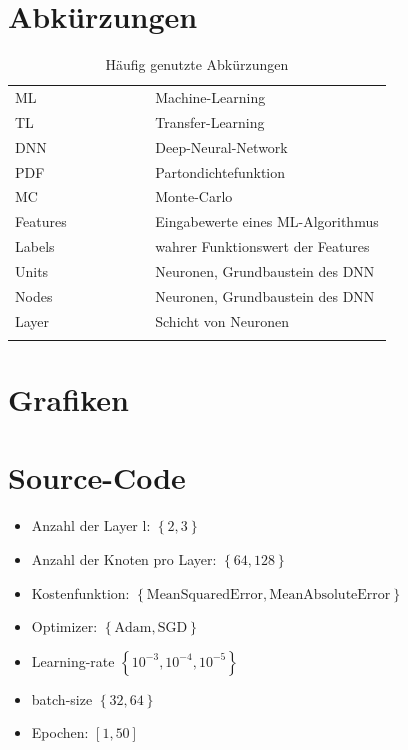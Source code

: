\section{Abkürzungen}
\begin{table}[htp]
	\centering
	\begin{tabular}{ll}
		ML $\hspace{3cm}$& Machine-Learning \\
		TL & Transfer-Learning \\
		DNN & Deep-Neural-Network \\
		PDF & Partondichtefunktion \\
		MC & Monte-Carlo \\
		Features & Eingabewerte eines ML-Algorithmus \\
		Labels & wahrer Funktionswert der Features \\
		Units & Neuronen, Grundbaustein des DNN \\
		Nodes & Neuronen, Grundbaustein des DNN \\
		Layer & Schicht von Neuronen \\
		&\\
	\end{tabular}
	\caption{Häufig genutzte Abkürzungen}
\end{table}

\section{Grafiken}
\section{Source-Code}


%


\begin{itemize}
	\setlength\itemsep{0.1cm}
	\setlength{\parskip}{0.1cm}
	\item Anzahl der Layer l: $\left\lbrace2, 3\right\rbrace$  
	\item Anzahl der Knoten pro Layer: $\left\lbrace64, 128 \right\rbrace $
	\item Kostenfunktion: $\left\lbrace \text{MeanSquaredError}, \text{MeanAbsoluteError} \right\rbrace$
	\item Optimizer: $\left\lbrace \text{Adam}, \text{SGD} \right\rbrace$
	\item Learning-rate $\left\lbrace 10^{-3}, 10^{-4}, 10^{-5} \right\rbrace$
	\item batch-size $\left\lbrace 32, 64 \right\rbrace$
	\item Epochen: $\left[1,50\right]$
\end{itemize}

